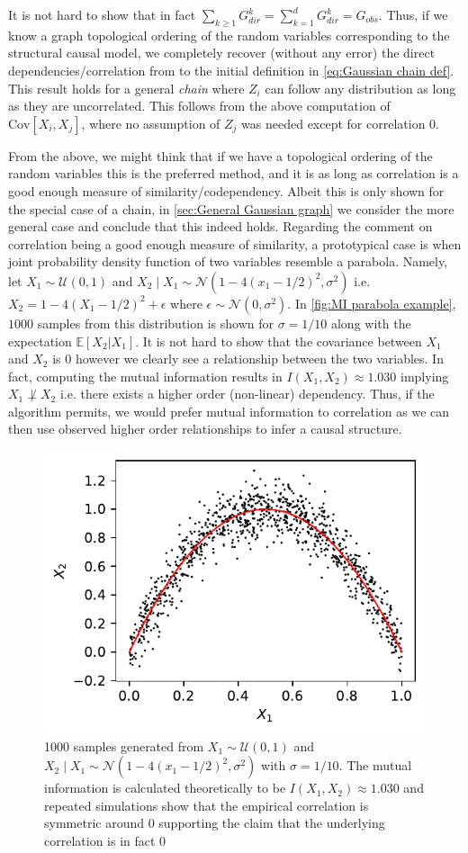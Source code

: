 \documentclass[../Thesis.tex]{subfiles}
\begin{document}
It is not hard to show that in fact $\sum_{k\geq 1} G_{dir}^k = \sum_{k=1}^d G_{dir}^k = G_{obs}$. Thus, if we know a graph topological ordering of the random variables corresponding to the structural causal model, we completely recover (without any error) the direct dependencies/correlation from to the initial definition in \autoref{eq:Gaussian chain def}. This result holds for a general \textit{chain} where $Z_i$ can follow any distribution as long as they are uncorrelated. This follows from the above computation of $\text{Cov}\left[X_i,X_j\right]$, where no assumption of $Z_j$ was needed except for correlation $0$.

From the above, we might think that if we have a topological ordering of the random variables this is the preferred method, and it is as long as correlation is a good enough measure of similarity/codependency. Albeit this is only shown for the special case of a chain, in \autoref{sec:General Gaussian graph} we consider the more general case and conclude that this indeed holds. Regarding the comment on correlation being a good enough measure of similarity, a prototypical case is when joint probability density function of two variables resemble a parabola. Namely, let $X_1\sim \mathcal{U}\left(0,1\right)$ and $X_2 \mid X_1 \sim \mathcal{N}\left(1 - 4\left(x_1 - 1/2\right)^2 , \sigma^2\right)$ i.e. $X_2 = 1 - 4 \left(X_1 - 1/2\right)^2 + \epsilon$ where $\epsilon \sim \mathcal{N}\left(0,\sigma^2\right)$. In \autoref{fig:MI parabola example}, $1000$ samples from this distribution is shown for $\sigma = 1/10$ along with the expectation $\mathbb{E}\left[X_2 | X_1\right]$. It is not hard to show that the covariance between $X_1$ and $X_2$ is $0$ however we clearly see a relationship between the two variables. In fact, computing the mutual information results in $I\left(X_1,X_2\right) \approx 1.030$ implying $X_1 \not\perp X_2$ i.e. there exists a higher order (non-linear) dependency. Thus, if the algorithm permits, we would prefer mutual information to correlation as we can then use observed higher order relationships to infer a causal structure.
\begin{figure}[ht]
    \centering
    \includegraphics[width=.55\linewidth]{figures/Mutual information figures/parabola example.pdf}
    \caption{1000 samples generated from $X_1\sim \mathcal{U}\left(0,1\right)$ and $X_2 \mid X_1 \sim \mathcal{N}\left(1 - 4\left(x_1 - 1/2\right)^2 , \sigma^2\right)$ with $\sigma = 1/10$. The mutual information is calculated theoretically to be $I\left(X_1,X_2\right) \approx 1.030$ and repeated simulations show that the empirical correlation is symmetric around $0$ supporting the claim that the underlying correlation is in fact $0$} %
    \label{fig:MI parabola example}
\end{figure}
\end{document}
